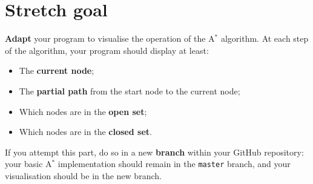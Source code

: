 \documentclass{scrartcl}
\begin{document}
\section*{Stretch goal}

\textbf{Adapt} your program to visualise the operation of the A$^*$ algorithm.
At each step of the algorithm, your program should display at least:
\begin{itemize}
    \item The \textbf{current node};
    \item The \textbf{partial path} from the start node to the current node;
    \item Which nodes are in the \textbf{open set};
    \item Which nodes are in the \textbf{closed set}.
\end{itemize}

If you attempt this part, do so in a new \textbf{branch} within your GitHub repository:
your basic A$^*$ implementation should remain in the \texttt{master} branch,
and your visualisation should be in the new branch.
\end{document}
